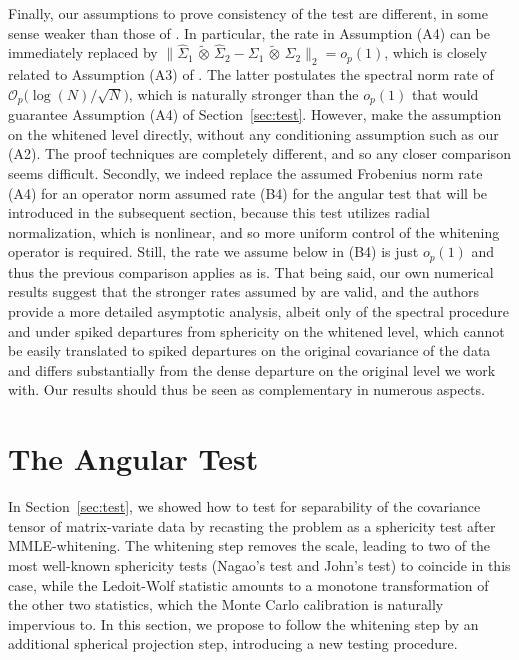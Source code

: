 \documentclass[12pt]{article}
\newcommand{\ot}{\,\tilde\otimes\,}
\begin{document}
Finally, our assumptions to prove consistency of the test are different, in some sense weaker than those of \citet{sung2026testing}. In particular, the rate in Assumption (A4) can be immediately replaced by $\|\widehat{\Sigma}_1 \ot\widehat{\Sigma}_2 - \Sigma_1 \ot \Sigma_2 \|_2 = o_p(1)$, which is closely related to Assumption (A3) of \citet{sung2026testing}. The latter postulates the spectral norm rate of $\mathcal{O}_p\big(\log(N)/\sqrt{N}\big)$, which is naturally stronger than the $o_p(1)$ that would guarantee Assumption (A4) of Section~\ref{sec:test}. However, \citet{sung2026testing} make the assumption on the whitened level directly, without any conditioning assumption such as our (A2). The proof techniques are completely different, and so any closer comparison seems difficult. Secondly, we indeed replace the assumed Frobenius norm rate (A4) for an operator norm assumed rate (B4) for the angular test that will be introduced in the subsequent section, because this test utilizes radial normalization, which is nonlinear, and so more uniform control of the whitening operator is required. Still, the rate we assume below in (B4) is just $o_p(1)$ and thus the previous comparison applies as is. That being said, our own numerical results suggest that the stronger rates assumed by \citet{sung2026testing} are valid, and the authors provide a more detailed asymptotic analysis, albeit only of the spectral procedure and under spiked departures from sphericity on the whitened level, which cannot be easily translated to spiked departures on the original covariance of the data and differs substantially from the dense departure on the original level we work with. Our results should thus be seen as complementary in numerous aspects.



\section{The Angular Test} \label{sec:angular}

In Section~\ref{sec:test}, we showed how to test for separability of the covariance tensor of matrix-variate data by recasting the problem as a sphericity test after MMLE-whitening. The whitening step removes the scale, leading to two of the most well-known sphericity tests (Nagao's test and John's test) to coincide in this case, while the Ledoit-Wolf statistic amounts to a monotone transformation of the other two statistics, which the Monte Carlo calibration is naturally impervious to. In this section, we propose to follow the whitening step by an additional spherical projection step, introducing a new testing procedure.
\end{document}
